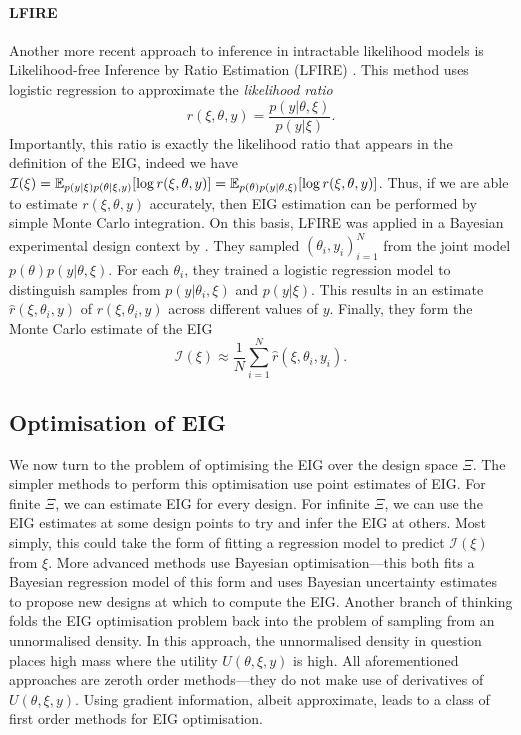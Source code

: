 \documentclass[a4paper, 10pt]{report}
\theoremstyle{plain}
\begin{document}
	\paragraph{LFIRE}
	Another more recent approach to inference in intractable likelihood models is Likelihood-free Inference by Ratio Estimation (LFIRE) \citep{dutta2016likelihood}.
	This method uses logistic regression to approximate the \emph{likelihood ratio}
	\begin{equation}
	r(\xi,\theta,y) = \frac{p(y|\theta,\xi)}{p(y|\xi)}.
	\end{equation}
	Importantly, this ratio is exactly the likelihood ratio that appears in the definition of the EIG, indeed we have $\mathcal{I}(\xi) = \mathbb{E}_{p(y|\xi)p(\theta|\xi,y)}[\log r(\xi,\theta,y)] = \mathbb{E}_{p(\theta)p(y|\theta,\xi)}[\log r(\xi,\theta,y)]$. Thus, if we are able to estimate $r(\xi,\theta,y)$ accurately, then EIG estimation can be performed by simple Monte Carlo integration.
	On this basis, LFIRE was applied in a Bayesian experimental design context by \citet{kleinegesse2018efficient}. 
	They sampled $(\theta_i,y_i)_{i=1}^N$ from the joint model $p(\theta)p(y|\theta,\xi)$.
	For each $\theta_i$, they trained a logistic regression model to distinguish samples from $p(y|\theta_i,\xi)$ and $p(y|\xi)$.
	This results in an estimate $\hat{r}(\xi,\theta_i,y)$ of $r(\xi,\theta_i,y)$ across different values of $y$.
	Finally, they form the Monte Carlo estimate of the EIG
	\begin{equation}
	\mathcal{I}(\xi) \approx \frac{1}{N} \sum_{i=1}^N \hat{r}(\xi,\theta_i,y_i).
	\end{equation}
	
	
	\subsection{Optimisation of EIG}
	\label{sec:opt_eig}
	We now turn to the problem of optimising the EIG over the design space $\Xi$. 
	The simpler methods to perform this optimisation use point estimates of EIG.
	For finite $\Xi$, we can estimate EIG for every design.
	For infinite $\Xi$, we can use the EIG estimates at some design points to try and infer the EIG at others.
	Most simply, this could take the form of fitting a regression model to predict $\mathcal{I}(\xi)$ from $\xi$.
	More advanced methods use Bayesian optimisation---this both fits a Bayesian regression model of this form and uses Bayesian uncertainty estimates to propose new designs at which to compute the EIG.
	Another branch of thinking folds the EIG optimisation problem back into the problem of sampling from an unnormalised density.
	In this approach, the unnormalised density in question places high mass where the utility $U(\theta,\xi,y)$ is high.
	All aforementioned approaches are zeroth order methods---they do not make use of derivatives of $U(\theta,\xi,y)$.
	Using gradient information, albeit approximate, leads to a class of first order methods for EIG optimisation.
	
\end{document}
